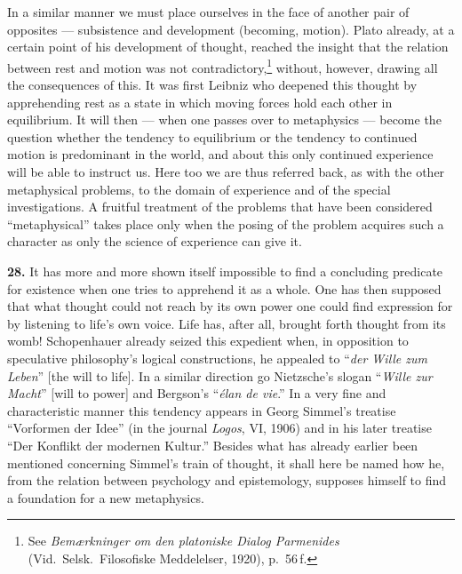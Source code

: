\documentclass[12pt]{book}
\newcommand{\hnum}[1]{\textbf{#1.}\enspace}
\newcommand{\opage}[1]{\marginnote{\footnotesize\textit{[#1]}}}
\begin{document}
In a similar manner we must place ourselves in the face of another pair of opposites --- subsistence and
development (becoming, motion). Plato already, at a certain point of his development of thought, reached the
insight that the relation between rest and motion was not contradictory,\footnote{See \textit{Bemærkninger om
den platoniske Dialog Parmenides} (Vid.\ Selsk.\ Filosofiske Meddelelser, 1920), p.\ 56\,f.} without, however,
drawing all the consequences of this. It was first Leibniz who deepened this thought by apprehending rest as a
state in which moving forces hold each other in equilibrium. It will then --- when one passes over to
metaphysics --- become the question whether the tendency to equilibrium or the tendency to continued motion is
predominant in the world, and about this only continued experience will be able to instruct us. Here too we are
thus referred back, as with the other metaphysical problems, to the domain of experience and of the special
investigations. A fruitful treatment of the problems that have been considered ``metaphysical'' takes place only
when the posing of the problem acquires such a character as only the science of experience can give it.

\opage{92}\hnum{28} It has more and more shown itself impossible to find a concluding predicate for existence when one
tries to apprehend it as a whole. One has then supposed that what thought could not reach by its own power one
could find expression for by listening to life's own voice. Life has, after all, brought forth thought from its
womb! Schopenhauer already seized this expedient when, in opposition to speculative philosophy's logical
constructions, he appealed to ``\textit{der Wille zum Leben}'' [the will to life]. In a similar direction go
Nietzsche's slogan ``\textit{Wille zur Macht}'' [will to power] and Bergson's ``\textit{élan de vie}.'' In a
very fine and characteristic manner this tendency appears in Georg Simmel's treatise ``Vorformen der Idee'' (in
the journal \textit{Logos}, VI, 1906) and in his later treatise ``Der Konflikt der modernen Kultur.'' Besides
what has already earlier been mentioned concerning Simmel's train of thought, it shall here be named how he, from
the relation between psychology and epistemology, supposes himself to find a foundation for a new metaphysics.
\end{document}
